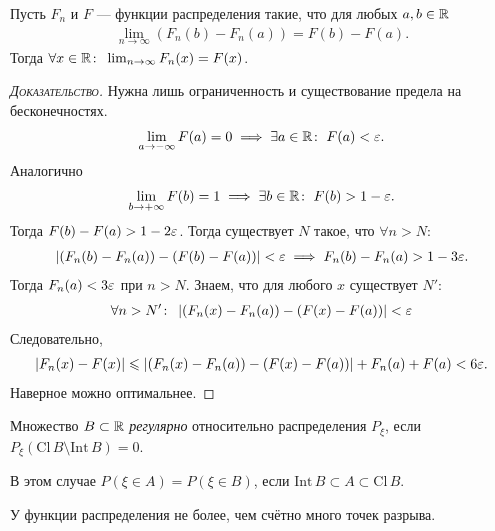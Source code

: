 \documentclass[../main.tex]{subfiles}
\begin{document}
\begin{remrk}
	\label{remrk:lim_f_n_using_f_n_a_minnus_f_n_b}
 Пусть $ F_n $ и $ F $ --- функции распределения такие, что для любых $ a, b \in \mathbb{R} $
 \begin{align*}
  \lim_{n \to \infty} (F_n(b) - F_n(a)) = F(b)  - F(a).
 \end{align*} Тогда $ \forall x \in \mathbb{R} \colon\; \lim_{n \to \infty}  F_n(x) = F(x)$.
\end{remrk}
\begin{proof}[\normalfont\textsc{Доказательство}]
 Нужна лишь ограниченность и существование предела на бесконечностях.
 \begin{align*}
  \lim_{a \to -\infty}  F(a) = 0 \implies \exists a \in \mathbb{R} \colon\;  F(a) < \varepsilon.
 \end{align*} Аналогично
 \begin{align*}
  \lim_{b \to +\infty} F(b) = 1 \implies \exists b \in \mathbb{R} \colon\; F(b) > 1 - \varepsilon. 
 \end{align*} Тогда $ F(b) - F(a) > 1 -2\varepsilon $. Тогда существует $ N $ такое, что $ \forall n > N \colon\;  $
 \begin{align*}
  \left|(F_n(b) - F_n(a)) - (F(b)-F(a)) \right| < \varepsilon \implies F_n(b) - F_n(a) > 1 - 3\varepsilon. 
 \end{align*} Тогда $ F_n(a) < 3\varepsilon $ при $ n > N $. Знаем, что для любого $ x $ существует $ N' $:
 \begin{align*}
  \forall n > N' \colon\; \left|(F_n(x) - F_n(a)) - (F(x)-F(a)) \right| < \varepsilon
 \end{align*} Следовательно,
 \begin{align*}
  \left|F_n(x) - F(x) \right| \leqslant \left| (F_n(x) - F_n(a)) - (F(x) - F(a)) \right| + F_n(a) + F(a) < 6\varepsilon.
 \end{align*} Наверное можно оптимальнее.
\end{proof}

\begin{df}
 Множество $ B \subset \mathbb{R} $ \textit{регулярно} относительно распределения $ P_\xi $, если $ P_\xi(\mathrm{Cl}\,B \setminus \mathrm{Int}\,B) = 0 $.
\end{df}

В этом случае $ P(\xi \in A) = P(\xi \in B) $, если $ \mathrm{Int}\,B \subset A \subset \mathrm{Cl}\,B $.

\begin{prop*}
 У функции распределения не более, чем счётно много точек разрыва.
\end{prop*}
\end{document}
